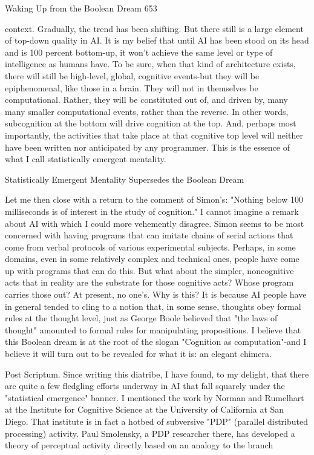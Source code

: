 Waking Up from the Boolean Dream                                                       653

context. Gradually, the trend has been shifting. But there still is a large element of
top-down quality in AI.
         It is my belief that until AI has been stood on its head and is 100 percent
bottom-up, it won't achieve the same level or type of intelligence as humans have. To
be sure, when that kind of architecture exists, there will still be high-level, global,
cognitive events-but they will be epiphenomenal, like those in a brain. They will not
in themselves be computational. Rather, they will be constituted out of, and driven by,
many many smaller computational events, rather than the reverse. In other words,
subcognition at the bottom will drive cognition at the top. And, perhaps most
importantly, the activities that take place at that cognitive top level will neither have
been written nor anticipated by any programmer. This is the essence of what I call
statistically emergent mentality.

         Statistically Emergent Mentality Supersedes the Boolean Dream

        Let me then close with a return to the comment of Simon's: "Nothing below
100 milliseconds is of interest in the study of cognition." I cannot imagine a remark
about AI with which I could more vehemently disagree. Simon seems to be most
concerned with having programs that can imitate chains of serial actions that come
from verbal protocols of various experimental subjects. Perhaps, in some domains,
even in some relatively complex and technical ones, people have come up with
programs that can do this. But what about the simpler, noncognitive acts that in reality
are the substrate for those cognitive acts? Whose program carries those out? At
present, no one's. Why is this?
        It is because AI people have in general tended to cling to a notion that, in some
sense, thoughts obey formal rules at the thought level, just as George Boole believed
that "the laws of thought" amounted to formal rules for manipulating propositions. I
believe that this Boolean dream is at the root of the slogan "Cognition as
computation"-and I believe it will turn out to be revealed for what it is: an elegant
chimera.

Post Scriptum.
        Since writing this diatribe, I have found, to my delight, that there are quite a
few fledgling efforts underway in AI that fall squarely under the "statistical
emergence" banner. I mentioned the work by Norman and Rumelhart at the Institute
for Cognitive Science at the University of California at San Diego. That institute is in
fact a hotbed of subversive "PDP" (parallel distributed processing) activity. Paul
Smolensky, a PDP researcher there, has developed a theory of perceptual activity
directly based on an analogy to the branch




